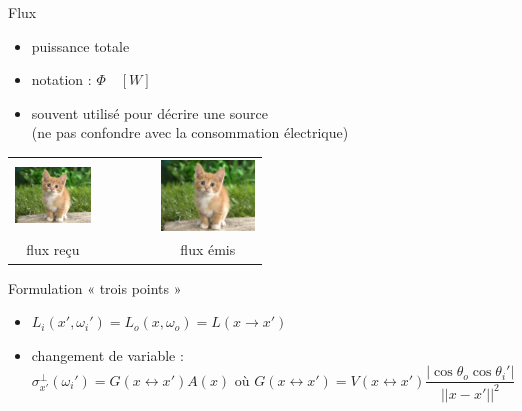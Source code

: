 \documentclass[10pt]{beamer}
\begin{document}
\begin{frame}{\large \insertsection}
    \begin{block}{Flux}
        \begin{itemize}
            \item puissance totale 
            \item notation : $\Phi \quad [W]$
            \item souvent utilisé pour décrire une source \\
                (ne pas confondre avec la consommation électrique)
        \end{itemize}
        \begin{center}
            \begin{tabular}{c c c}
                \includegraphics[width=2cm]{images/chaton.jpg} &
                ~~~~~~ &
                \includegraphics[width=2.5cm]{images/chaton.jpg} \\
                flux reçu & & flux émis 
            \end{tabular}
        \end{center}
    \end{block} 
\end{frame}

\begin{frame}{\large \insertsection}
    \begin{block}{Formulation « trois points » }
        \begin{itemize}
            \item $L_i(x', \omega_i') = L_o(x, \omega_o) = L(x \rightarrow x')$ 
            \item changement de variable :
                \scriptsize
                $$\sigma_{x'}^\perp(\omega_i') = G(x \leftrightarrow x') A(x) \text{ où } G(x \leftrightarrow x') = V(x \leftrightarrow x') \frac{|\cos \theta_o \cos \theta_i'|}{|| x - x' ||^2}$$
                \normalsize
        \end{itemize}
    \end{block} 
\end{frame}
\end{document}
